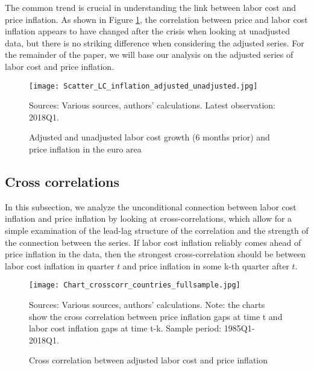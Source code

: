 \documentclass[11pt]{article}
\begin{document}
The common trend is crucial in understanding the link between labor cost and price inflation. As shown in Figure \ref{fig:Figure_scatter}, the correlation between price and labor cost inflation appears to have changed after the crisis when looking at unadjusted data, but there is no striking difference when considering the adjusted series. 
For the remainder of the paper, we will base our analysis on the adjusted series of labor cost and price inflation.

\begin{figure}
\begin{center}
\caption{Adjusted and unadjusted labor cost growth (6 months prior) and price inflation in the euro area}\label{fig:Figure_scatter}
\texttt{[image: Scatter\_LC\_inflation\_adjusted\_unadjusted.jpg]}

\begin{minipage}{\textwidth} {\footnotesize
Sources: Various sources, authors' calculations.
Latest observation: 2018Q1.\par}
\end{minipage}
\end{center}
\end{figure}

\subsection{Cross correlations}
In this subsection, we analyze the unconditional connection between labor cost inflation and price inflation by looking at cross-correlations, which allow for a simple examination of the lead-lag structure of the correlation and the strength of the connection between the series. If labor cost inflation reliably comes ahead of price inflation in the data, then the strongest cross-correlation should be between labor cost inflation in quarter $t$ and price inflation in some k-th quarter after $t$.

\begin{figure}
\begin{center}
\caption{Cross correlation between adjusted labor cost and price inflation}\label{fig:Figure_crosscorr_countries_fullsample}
\texttt{[image: Chart\_crosscorr\_countries\_fullsample.jpg]}
\begin{minipage}{\textwidth} {\footnotesize
Sources: Various sources, authors' calculations.
Note: the charts show the cross correlation between price inflation gaps at time t and labor cost inflation gaps at time t-k.
Sample period: 1985Q1-2018Q1.\par}
\end{minipage}
\end{center}
\end{figure}
\end{document}
